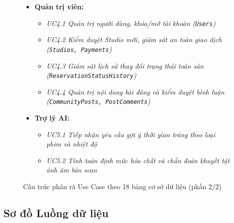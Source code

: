 \begin{figure}[H]
\centering
\begin{tcolorbox}[colback=blue!5!white,colframe=blue!75!black,title=\textbf{BẢNG TỔNG HỢP CÁC USE CASE TƯƠNG ỨNG VỚI 18 BẢNG TRONG CƠ SỞ DỮ LIỆU (tiếp theo)}]
\begin{itemize}[leftmargin=1.5em]
    \item \textbf{Quản trị viên:}
    \begin{itemize}
        \item \textit{UC4.1 Quản trị người dùng, khóa/mở tài khoản (\texttt{Users})}
        \item \textit{UC4.2 Kiểm duyệt Studio mới, giám sát an toàn giao dịch (\texttt{Studios, Payments})}
        \item \textit{UC4.3 Giám sát lịch sử thay đổi trạng thái toàn sàn (\texttt{ReservationStatusHistory})}
        \item \textit{UC4.4 Quản trị nội dung bài đăng và kiểm duyệt bình luận (\texttt{CommunityPosts, PostComments})}
    \end{itemize}
    \item \textbf{Trợ lý AI:}
    \begin{itemize}
        \item \textit{UC5.1 Tiếp nhận yêu cầu gợi ý thời gian tráng theo loại phim và nhiệt độ}
        \item \textit{UC5.2 Tính toán định mức hóa chất và chẩn đoán khuyết tật ảnh âm bản scan}
    \end{itemize}
\end{itemize}
\end{tcolorbox}
\caption{Cấu trúc phân rã Use Case theo 18 bảng cơ sở dữ liệu (phần 2/2)}
\end{figure}

\subsection{Sơ đồ Luồng dữ liệu}


